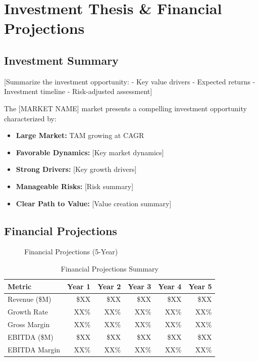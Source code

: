 \documentclass[11pt,letterpaper]{report}
\newcommand{\reporttitle}{[MARKET NAME]}
\begin{document}
\chapter{Investment Thesis \& Financial Projections}

\section{Investment Summary}

[Summarize the investment opportunity:
- Key value drivers
- Expected returns
- Investment timeline
- Risk-adjusted assessment]

\begin{executivesummarybox}
The \reporttitle{} market presents a compelling investment opportunity characterized by:

\begin{itemize}
    \item \textbf{Large Market:}  TAM growing at  CAGR
    \item \textbf{Favorable Dynamics:} [Key market dynamics]
    \item \textbf{Strong Drivers:} [Key growth drivers]
    \item \textbf{Manageable Risks:} [Risk summary]
    \item \textbf{Clear Path to Value:} [Value creation summary]
\end{itemize}
\end{executivesummarybox}

\section{Financial Projections}


\begin{figure}[htbp]
\centering
\caption{Financial Projections (5-Year)}
\label{fig:financials}
\end{figure}

\begin{table}[htbp]
\centering
\caption{Financial Projections Summary}
\begin{tabular}{@{}lrrrrr@{}}
\toprule
\textbf{Metric} & \textbf{Year 1} & \textbf{Year 2} & \textbf{Year 3} & \textbf{Year 4} & \textbf{Year 5} \\
\midrule
Revenue (\$M) & \$XX & \$XX & \$XX & \$XX & \$XX \\
\rowcolor{tablealt} Growth Rate & XX\% & XX\% & XX\% & XX\% & XX\% \\
Gross Margin & XX\% & XX\% & XX\% & XX\% & XX\% \\
\rowcolor{tablealt} EBITDA (\$M) & \$XX & \$XX & \$XX & \$XX & \$XX \\
EBITDA Margin & XX\% & XX\% & XX\% & XX\% & XX\% \\
\bottomrule
\end{tabular}
\label{tab:financials}
\end{table}
\end{document}
